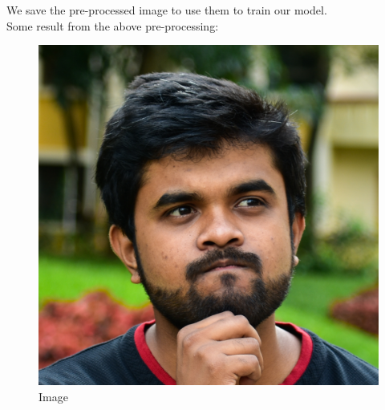 We save the pre-processed image to use them to train our model. \\
Some result from the above pre-processing:

\begin{figure}[!h]
    \centering
    \includegraphics[width=0.3\linewidth]{image.jpg}
    \caption{Image}
    \label{fig1}
\end{figure}



